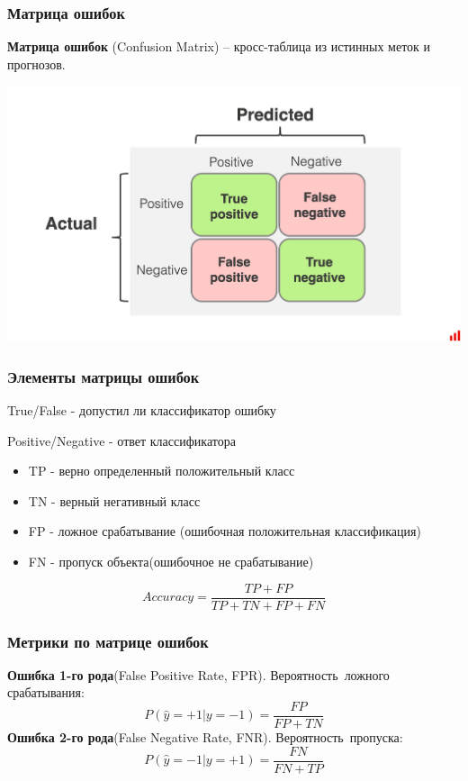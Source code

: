\documentclass{beamer}
\begin{document}
	\begin{frame}
		\frametitle{Матрица ошибок}
		\textbf{Матрица ошибок} (Confusion Matrix) -- кросс-таблица из истинных меток и прогнозов.
		
		\includegraphics[width=1.1\textwidth]{img/confusion_matrix.png}
	\end{frame}

	\begin{frame}
		\frametitle{Элементы матрицы ошибок}
		True/False - допустил ли классификатор ошибку
		
		Positive/Negative - ответ классификатора
		
		\vspace{15pt}
		
		\begin{itemize}
			\item TP - верно определенный положительный класс
			\item TN - верный негативный класс
			\item FP - ложное срабатывание (ошибочная положительная классификация)
			\item FN - пропуск объекта(ошибочное не срабатывание)
		\end{itemize}
		
		\vspace{10pt}
		
		\[
		Accuracy = \frac{TP + FP}{TP + TN + FP + FN}
		\]
	\end{frame}
	
	\begin{frame}
		\frametitle{Метрики по матрице ошибок}
		\textbf{Ошибка 1-го рода}(False Positive Rate, FPR). Вероятность~ложного срабатывания: 
		\[
		P(\hat{y}=+1 | y = -1) = \frac{FP}{FP + TN}
		\]
		\textbf{Ошибка 2-го рода}(False Negative Rate, FNR). Вероятность~пропуска:
		\[
		P(\hat{y}=-1 | y = +1) = \frac{FN}{FN + TP}
		\]
	\end{frame}
	
\end{document}
